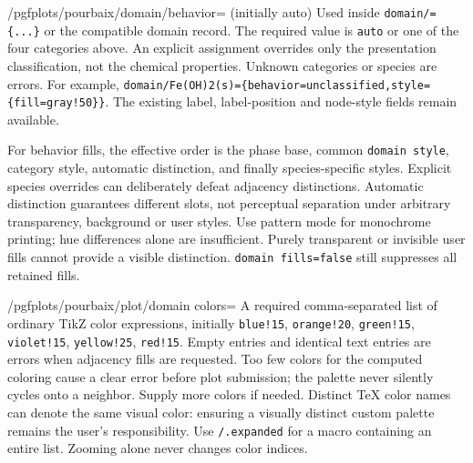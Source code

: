 \documentclass[a4paper,11pt]{ltxdoc}
\begin{document}
\begin{key}{/pgfplots/pourbaix/domain/behavior= (initially auto)}
Used inside \texttt{domain/=\{...\}} or the compatible domain record.
The required value is \texttt{auto} or one of the four categories above. An explicit
assignment overrides only the presentation classification, not the chemical
properties. Unknown categories or species are errors. For example,
\verb|domain/Fe(OH)2(s)={behavior=unclassified,style={fill=gray!50}}|.
The existing label, label-position and node-style fields remain available.
\end{key}

For behavior fills, the effective order is the phase base, common
\texttt{domain style}, category style, automatic distinction, and finally
species-specific styles. Explicit species overrides can deliberately defeat
adjacency distinctions. Automatic distinction guarantees different slots, not
perceptual separation under arbitrary transparency, background or user styles.
Use pattern mode for monochrome printing; hue differences alone are insufficient.
Purely transparent or invisible user fills cannot provide a visible distinction.
\texttt{domain fills=false} still suppresses all retained fills.

\begin{key}{/pgfplots/pourbaix/plot/domain colors=}
A required comma-separated list of ordinary TikZ color expressions, initially
\texttt{blue!15}, \texttt{orange!20}, \texttt{green!15}, \texttt{violet!15},
\texttt{yellow!25}, \texttt{red!15}. Empty entries and identical text entries are
errors when adjacency fills are requested. Too few colors for the computed
coloring cause a clear error before plot submission; the palette never silently
cycles onto a neighbor. Supply more colors if needed. Distinct TeX color names
can denote the same visual color: ensuring a visually distinct custom palette
remains the user's responsibility. Use \texttt{/.expanded} for a macro containing
an entire list. Zooming alone never changes color indices.
\end{key}
\end{document}
